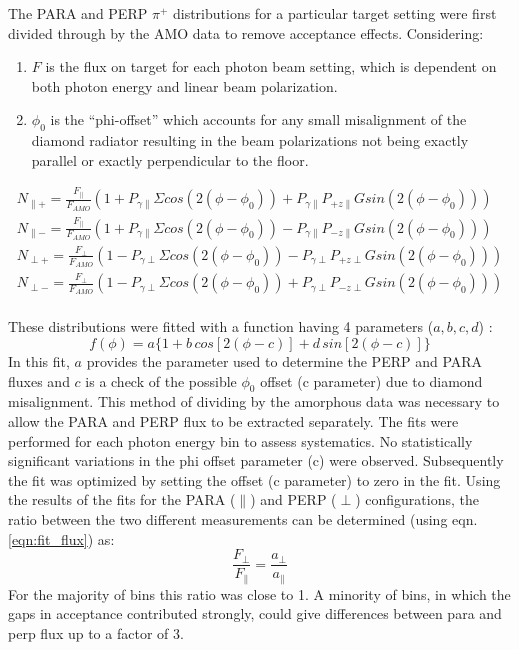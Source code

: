 The PARA and PERP $\pi^+$ distributions for a particular target setting were first divided through by the AMO data to remove acceptance effects.
Considering:
\begin{enumerate}
  \item $F$ is the flux on target for each photon beam setting, which is dependent on both photon energy and linear beam polarization. 
  \item $\phi_0$ is the “phi-offset” which accounts for any small misalignment of the diamond radiator resulting in the beam polarizations not being exactly parallel or exactly perpendicular to the floor.
\end{enumerate}

\begin{eqnarray}
N_{\parallel +} = \frac{F_{\parallel}}{F_{AMO}} \left( 1 + P_{\gamma \parallel}\Sigma cos(2(\phi-\phi_0)) + P_{\gamma \parallel} P_{+z\parallel} G sin(2(\phi-\phi_0)) \right) \label{eq:N1}\\
N_{\parallel -} = \frac{F_{\parallel}}{F_{AMO}} \left( 1 + P_{\gamma \parallel}\Sigma cos(2(\phi-\phi_0)) - P_{\gamma \parallel} P_{-z\parallel} G sin(2(\phi-\phi_0)) \right) \label{eq:N2}\\
N_{\perp +} = \frac{F_{\perp}}{F_{AMO}} \left( 1 - P_{\gamma \perp}\Sigma cos(2(\phi-\phi_0)) - P_{\gamma \perp} P_{+z\perp} G sin(2(\phi-\phi_0)) \right) \label{eq:N3}\\
N_{\perp -} = \frac{F_{\perp}}{F_{AMO}} \left( 1 - P_{\gamma \perp}\Sigma cos(2(\phi-\phi_0)) + P_{\gamma \perp} P_{-z\perp} G sin(2(\phi-\phi_0)) \right) \label{eq:N4}\\
\end{eqnarray}


These distributions were fitted with a function having 4 parameters ($ a,b,c,d $) :
\begin{equation} \label{eqn:fit_flux}
f(\phi) = a \{ 1 + b\, cos[2 (\phi - c) ]  + d\, sin[2(\phi - c)] \} 
\end{equation}
In this fit, $a$ provides the parameter used to determine the PERP and PARA fluxes and $c$ is a check of the possible $\phi_0$ offset (c parameter) due to diamond misalignment.
This method of dividing by the amorphous data was necessary to allow the PARA and PERP flux to be extracted separately. The fits were performed for each photon energy bin to assess systematics. No statistically significant variations in the phi offset parameter (c) were observed. Subsequently the fit was optimized by setting the offset (c parameter) to zero in the fit. 
Using the results of the fits for the PARA ($\parallel$) and PERP ($\perp$) configurations, the ratio between the two different measurements can be determined (using eqn. \ref{eqn:fit_flux}) as:
\begin{equation}
\frac{F_{\perp}}{F_{\parallel}} = \frac{a_{\perp}}{a_{\parallel}}
\end{equation}
For the majority of bins this ratio was close to 1. A minority of bins, in which the gaps in acceptance contributed strongly, could give differences between para and perp flux up to a factor of 3. 


